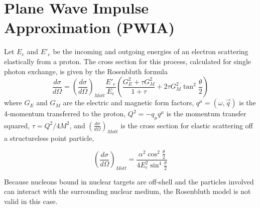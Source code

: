 \section{Plane Wave Impulse Approximation (PWIA)}

Let $E_e$ and $E'_e$ be the incoming and outgoing energies of an electron
scattering elastically from a proton.
The cross section for this process, calculated for single photon exchange,
is given by the Rosenbluth formula
\begin{equation}
\frac{d\sigma}{d\Omega} = \left( \frac{d\sigma}{d\Omega} \right)_{Mott}
                          \frac{E'_e}{E_e}
                          \left(
                                \frac{G_E^2 + \tau G_M^2}{1+\tau} +
                                2 \tau G_M^2 \tan^2 \frac{\theta}{2}
                          \right)
\end{equation}
where
$G_E$ and $G_M$ are the electric and magnetic form factors,
$q^\mu=(\omega,\vec{q})$ is the 4-momentum transferred to the proton,
$Q^2=-q_\mu q^\mu$ is the momentum transfer squared,
$\tau=Q^2/4M^2$,
and $\left( \frac{d\sigma}{d\Omega} \right)_{Mott}$ is the cross section for
elastic scattering off a structureless point particle,

\begin{equation}
    \left( \frac{d\sigma}{d\Omega} \right)_{Mott} =
                    \frac{\alpha^2 \cos^2 \frac{\theta}{2}}
                         {4E_e^2 \sin^4 \frac{\theta}{2}}
\end{equation}

Because nucleons bound in nuclear targets are off-shell and the particles
involved can interact with the surrounding nuclear medium, the Rosenbluth model
is not valid in this case.

